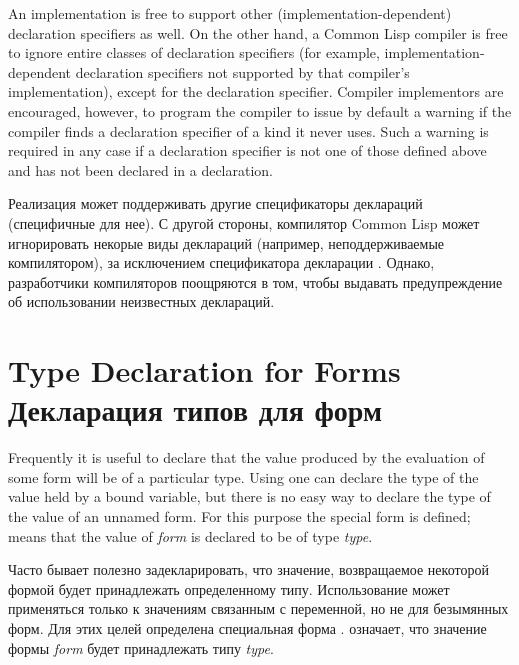 An implementation is free to support other (implementation-dependent)
declaration specifiers as well.
On the other hand, a Common Lisp compiler is free to
ignore entire classes of declaration specifiers (for example,
implementation-dependent declaration specifiers
not supported by that compiler's
implementation), except for the  declaration specifier.
Compiler implementors are encouraged, however, to
program the compiler to issue by default a warning if the compiler finds
a declaration specifier of a kind it never uses.  Such a warning is required
in any case
if a declaration specifier is not one of those defined above and has not been
declared in a  declaration.

Реализация может поддерживать другие спецификаторы деклараций (специфичные для
нее).
С другой стороны, компилятор Common Lisp может игнорировать некорые виды
деклараций (например, неподдерживаемые компилятором), за исключением
спецификатора декларации .
Однако, разработчики компиляторов поощряются в том, чтобы выдавать
предупреждение об использовании неизвестных деклараций.

\section{Type Declaration for Forms Декларация типов для форм}

Frequently it is useful to declare that the value produced
by the evaluation of some form will be of a particular type.
Using  one can declare the type of the value
held by a bound variable, but there is no easy way to declare
the type of the value of an unnamed form.  For this purpose the 
special form is defined;  means
that the value of \emph{form} is declared to be of type \emph{type}.

Часто бывает полезно задекларировать, что значение, возвращаемое некоторой
формой будет принадлежать определенному типу.
Использование  может применяться только к значениям связанным с
переменной, но не для безымянных форм. Для этих целей определена специальная
форма .   означает, что значение
формы \emph{form} будет принадлежать типу \emph{type}.

